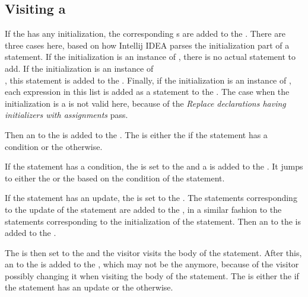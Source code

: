 \subsection{Visiting a }

If the  has any initialization, the corresponding s are added to the
. There are three cases here, based on how Intellij IDEA parses the initialization part of a
 statement. If the initialization is an instance of , there is no actual statement to
add. If the initialization is an instance of\\
, this statement is added to the . Finally, if the initialization is an
instance of , each expression in this list is added as a statement to the
. The case when the initialization is a  is not valid here, because of
the \textit{Replace declarations having initializers with assignments} pass.

Then an  to the  is added to the . The
 is either the  if the  statement has a condition or the
 otherwise.

If the  statement has a condition, the  is set to the  and a
 is added to the . It jumps to either the  or the
 based on the condition of the  statement.

If the  statement has an update, the  is set to the . The statements
corresponding to the update of the  statement are added to the , in a similar fashion to
the statements corresponding to the initialization of the  statement. Then an 
to the  is added to the .

The  is then set to the  and the visitor visits the body of the  statement.
After this, an  to the  is added to the , which
may not be the  anymore, because of the visitor possibly changing it when visiting the body of the
 statement. The  is either the  if the  statement has
an update or the  otherwise.

